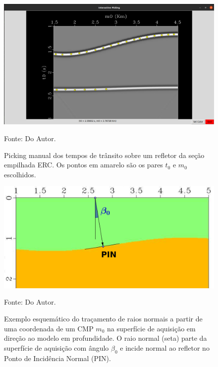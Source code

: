 \begin{figure}[H]
\caption{Picking manual dos tempos de trânsito sobre um refletor da seção empilhada ERC. Os pontos
em amarelo são os pares $t_0$ e $m_0$ escolhidos.}
\begin{center}
\includegraphics[scale=0.3]{images/picking.png}
\vspace{-0.3cm}
\end{center}
\begin{center}
 Fonte: Do Autor.
\end{center}
\label{fig:9.4}
\end{figure}

\begin{figure}[H]
\caption{Exemplo esquemático do traçamento de raios normais a partir de uma coordenada de um CMP $m_0$
na superfície de aquisição em direção ao modelo em profundidade.
O raio normal (seta) parte da superfície de aquisição com ângulo $\beta_0$ e incide normal
ao refletor no Ponto de Incidência Normal (PIN).}
\begin{center}
\includegraphics[scale=0.5]{images/modelagem.png}
\vspace{-0.3cm}
\end{center}
\begin{center}
 Fonte: Do Autor.
\end{center}
\label{fig:9.5}
\end{figure}

